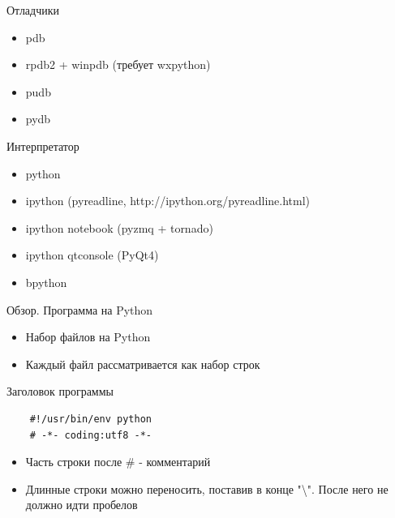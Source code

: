 \documentclass{article}
\begin{document}
\begin{center} Отладчики \end{center}
\begin{itemize}
    \item pdb
    \item rpdb2 + winpdb (требует wxpython)
    \item pudb
    \item pydb
\end{itemize}
\newpage

\begin{center} Интерпретатор \end{center}
\begin{itemize}
    \item python
    \item ipython (pyreadline, http://ipython.org/pyreadline.html)
    \item ipython notebook (pyzmq + tornado)
    \item ipython qtconsole (PyQt4)
    \item bpython
\end{itemize}
\newpage

\begin{center} Обзор. Программа на Python \end{center}
\begin{itemize}
    \item Набор файлов на Python
    \item Каждый файл рассматривается как набор строк
\end{itemize}
\begin{center} Заголовок программы \end{center}
\vspace{15pt}
\begin{lstlisting}
    #!/usr/bin/env python
    # -*- coding:utf8 -*-
\end{lstlisting}

\begin{itemize}
    \item Часть строки после \# - комментарий
    \item Длинные строки можно переносить, поставив в конце 
    		"\textbackslash". После него не должно идти пробелов
\end{itemize}
\newpage
\end{document}
